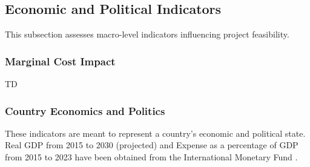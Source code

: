\subsection{Economic and Political Indicators}
This subsection assesses macro-level indicators influencing project feasibility.


\subsubsection{Marginal Cost Impact}
TD




\subsubsection{Country Economics and Politics}
These indicators are meant to represent a country's economic and political state. 
Real GDP from 2015 to 2030 (projected) and Expense as a percentage of GDP from 2015 to 2023 have been obtained from the International Monetary Fund \cite{PLACEHOLDER}. \\

